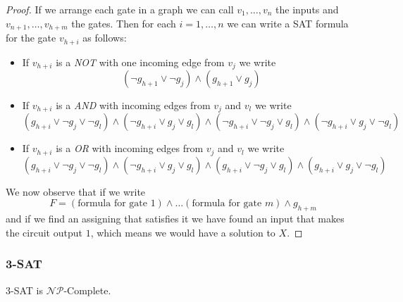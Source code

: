 \documentclass[12pt]{extarticle}
\newcommand{\NP}{{\mathcal{NP}}}
\newcommand{\NPC}{$\NP$-Complete}
\begin{document}
\begin{proof}
    If we arrange each gate in a graph we can call $v_1, \dots, v_n$ the inputs and $v_{n+1}, \dots, v_{h+m}$ the gates.
    Then for each $i = 1, \dots, n$ we can write a SAT formula for the gate $v_{h+i}$ as follows:
    \begin{itemize}
        \item If $v_{h+i}$ is a \emph{NOT} with one incoming edge from $v_j$ we write
              \begin{equation}
                  (\lnot g_{h+1} \lor \lnot g_j) \land (g_{h+1} \lor g_j)
              \end{equation}
        \item If $v_{h+i}$ is a \emph{AND} with incoming edges from $v_j$ and $v_l$ we write
              \begin{equation}
                  (g_{h+i} \lor \lnot g_j \lor \lnot g_l) \land
                  (\lnot g_{h+i} \lor g_j \lor g_l ) \land
                  (\lnot g_{h+i} \lor \lnot g_j \lor g_l ) \land
                  (\lnot g_{h+i} \lor g_j \lor \lnot g_l)
              \end{equation}

        \item If $v_{h+i}$ is a \emph{OR} with incoming edges from $v_j$ and $v_l$ we write
              \begin{equation}
                  (g_{h+i} \lor \lnot g_j \lor \lnot g_l) \land
                  (\lnot g_{h+i} \lor g_j \lor g_l ) \land
                  (g_{h+i} \lor \lnot g_j \lor g_l ) \land
                  (g_{h+i} \lor g_j \lor \lnot g_l)
              \end{equation}
    \end{itemize}

    We now observe that if we write
    \begin{equation}
        F = (\text{formula for gate } 1) \land \dots (\text{formula for gate } m) \land g_{h+m}
    \end{equation}
    and if we find an assigning that satisfies it we have found an input that makes the circuit output $1$, which means we would have a solution to $X$.
\end{proof}

\subsubsection{3-SAT}

\begin{theorem}
    3-SAT is \NPC.
\end{theorem}
\end{document}
